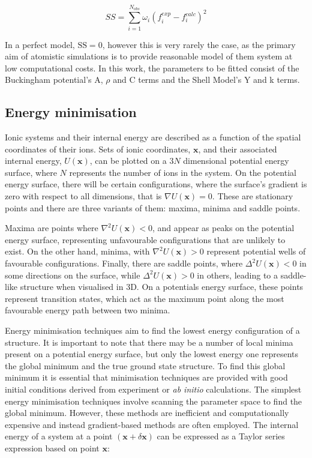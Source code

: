 \documentclass[12pt]{report}
\begin{document}
\begin{equation}
    SS = \sum_{i=1}^{N_{obs}} \omega_i (f_i^{exp} - f_i^{calc})^2
\label{sumsquares}
\end{equation}

\noindent
In a perfect model, $\mathrm{SS = 0}$, however this is very rarely the case, as the primary aim of atomistic simulations is to provide reasonable model of them system at low computational costs.
In this work, the parameters to be fitted consist of the Buckingham potential's A, $\rho$ and C terms and the Shell Model's Y and k terms.

\subsection{Energy minimisation}

Ionic systems and their internal energy are described as a function of the spatial coordinates of their ions.
Sets of ionic coordinates, $\textbf{x}$, and their associated internal energy, $U(\textbf{x})$, can be plotted on a $3N$ dimensional potential energy surface, where $N$ represents the number of ions in the system.
On the potential energy surface, there will be certain configurations, where the surface's gradient is zero with respect to all dimensions, that is $\nabla U(\textbf{x}) = 0$.
These are stationary points and there are three variants of them: maxima, minima and saddle points.

Maxima are points where $\nabla^2 U(\textbf{x}) < 0$, and appear as peaks on the potential energy surface, representing unfavourable configurations that are unlikely to exist.
On the other hand, minima, with $\nabla^2 U(\textbf{x}) > 0$ represent potential wells of favourable configurations.
Finally, there are saddle points, where $\Delta^2 U(\textbf{x}) < 0$ in some directions on the surface, while $\Delta^2 U(\textbf{x}) > 0$ in others, leading to a saddle-like structure when visualised in 3D.
On a potentials energy surface, these points represent transition states, which act as the maximum point along the most favourable energy path between two minima.

Energy minimisation techniques aim to find the lowest energy configuration of a structure.
It is important to note that there may be a number of local minima present on a potential energy surface, but only the lowest energy one represents the global minimum and the true ground state structure.\cite{bush1995}
To find this global minimum it is essential that minimisation techniques are provided with good initial conditions derived from experiment or \textit{ab initio} calculations.
The simplest energy minimisation techniques involve scanning the parameter space to find the global minimum. 
However, these methods are inefficient and computationally expensive and instead gradient-based methods are often employed.
The internal energy of a system at a point $(\textbf{x} + \delta\textbf{x})$ can be expressed as a Taylor series expression based on point $\textbf{x}$:
\end{document}
